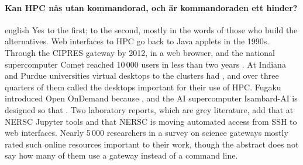 \paragraph{%
  {Kan HPC nås utan kommandorad, och är kommandoraden ett hinder?}} %
\begin{onlyin}{english} %
Yes to the first; to the second, mostly in the words of those who build
the alternatives.  Web interfaces to HPC go back to Java applets in the
1990s\autocite{Calegari2019Portals}.  Through the CIPRES gateway
 by 2012, in a
web browser, and the national supercomputer Comet reached 10\,000 users in
less than two years .  At Indiana and Purdue universities virtual desktops to the
clusters had , and over three quarters of them called the
desktops important for their use of HPC\autocite{Thota2019Desktops}.
Fugaku introduced Open OnDemand because
, and the
AI supercomputer Isambard-AI is designed so that
.  Two
laboratory reports, which are grey literature, add that at NERSC Jupyter
tools 
and that NERSC is moving automated access from SSH to web
interfaces\autocite{Majumder2026HEPCloud}.  Nearly 5\,000 researchers in a
survey on science gateways mostly rated such online resources important
to their work\autocite{Lawrence2015Gateways}, though the abstract does not
say how many of them use a gateway instead of a command line.


\end{onlyin}
